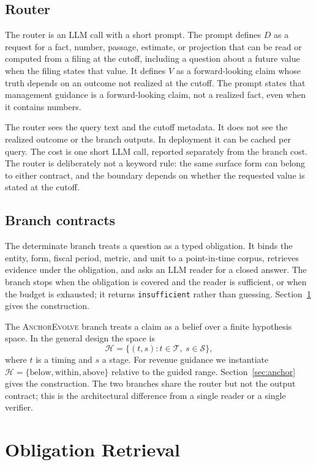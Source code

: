 \documentclass[11pt]{article}
\newcommand{\anchor}{\textsc{AnchorEvolve}}
\begin{document}
\subsection{Router}
The router is an LLM call with a short prompt. The prompt defines $D$ as a request for a fact, number, passage, estimate, or projection that can be read or computed from a filing at the cutoff, including a question about a future value when the filing states that value. It defines $V$ as a forward-looking claim whose truth depends on an outcome not realized at the cutoff. The prompt states that management guidance is a forward-looking claim, not a realized fact, even when it contains numbers.

The router sees the query text and the cutoff metadata. It does not see the realized outcome or the branch outputs. In deployment it can be cached per query. The cost is one short LLM call, reported separately from the branch cost. The router is deliberately not a keyword rule: the same surface form can belong to either contract, and the boundary depends on whether the requested value is stated at the cutoff.

\subsection{Branch contracts}
The determinate branch treats a question as a typed obligation. It binds the entity, form, fiscal period, metric, and unit to a point-in-time corpus, retrieves evidence under the obligation, and asks an LLM reader for a closed answer. The branch stops when the obligation is covered and the reader is sufficient, or when the budget is exhausted; it returns \texttt{insufficient} rather than guessing. Section~\ref{sec:obligation} gives the construction.

The \anchor{} branch treats a claim as a belief over a finite hypothesis space. In the general design the space is
\begin{equation}
\mathcal H=\{(t,s): t\in\mathcal T,\ s\in\mathcal S\},
\end{equation}
where $t$ is a timing and $s$ a stage. For revenue guidance we instantiate $\mathcal H=\{\text{below},\text{within},\text{above}\}$ relative to the guided range. Section~\ref{sec:anchor} gives the construction. The two branches share the router but not the output contract; this is the architectural difference from a single reader or a single verifier.

\section{Obligation Retrieval}
\label{sec:obligation}
\end{document}
